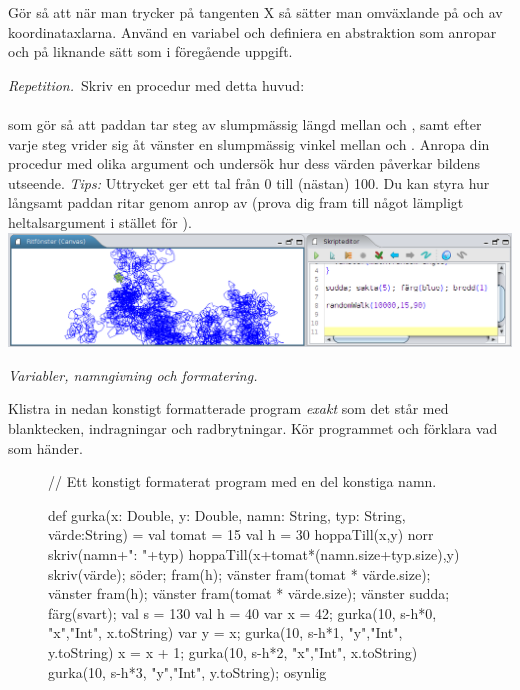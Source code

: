 \Subtask Gör så att när man trycker på tangenten X så sätter man omväxlande på och av koordinataxlarna. Använd en variabel  och definiera en abstraktion  som anropar  och  på liknande sätt som i föregående uppgift.


\Task \emph{Repetition.}~Skriv en procedur  med detta huvud: \\
\\ som gör så att paddan tar  steg av slumpmässig längd mellan  och , samt efter varje steg vrider sig åt vänster en slumpmässig vinkel mellan  och . Anropa din procedur med olika argument och undersök hur dess värden påverkar bildens utseende. \emph{Tips:} Uttrycket  ger ett tal från 0 till (nästan) 100. Du kan styra hur långsamt paddan ritar genom anrop av  (prova dig fram till något  lämpligt heltalsargument i stället för ).
\vspace{2em}\\\includegraphics[width=\textwidth]{../img/kojo/random-walk.png}


\Task \emph{Variabler, namngivning och formatering.}

\Subtask Klistra in nedan konstigt formatterade program \emph{exakt} som det står med blanktecken, indragningar och radbrytningar. Kör programmet och förklara vad som händer.

\begin{figure}[H]
\begin{Code}
// Ett konstigt formaterat program med en del konstiga namn.

def gurka(x: Double,
y: Double, namn: String,
typ: String,
värde:String) = {
val tomat = 15
val h = 30
hoppaTill(x,y)
norr
skriv(namn+": "+typ)
hoppaTill(x+tomat*(namn.size+typ.size),y)
skriv(värde); söder; fram(h); vänster
fram(tomat * värde.size); vänster
fram(h); vänster
fram(tomat * värde.size); vänster }
sudda; färg(svart); val s = 130
val h = 40
var x = 42; gurka(10, s-h*0, "x","Int", x.toString)
var y = x; gurka(10, s-h*1, "y","Int", y.toString)
x = x + 1; gurka(10, s-h*2, "x","Int", x.toString)
gurka(10, s-h*3, "y","Int", y.toString); osynlig
\end{Code}
\end{figure}

